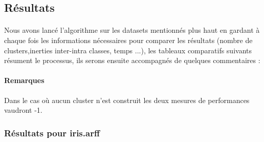 	\subsection{Résultats}
		\paragraph{}
		Nous avons lancé l'algorithme sur les datasets mentionnés plus haut en gardant à chaque fois les informations nécessaires pour comparer les résultats (nombre de clusters,inerties inter-intra classes, temps ...), les tableaux comparatifs suivants résument le processus, ils serons ensuite accompagnés de quelques commentaires :
		\paragraph{Remarques} 
		Dans le cas où aucun cluster n'est construit les deux mesures de performances vaudront -1.
		\subsubsection*{Résultats pour iris.arff }
		
